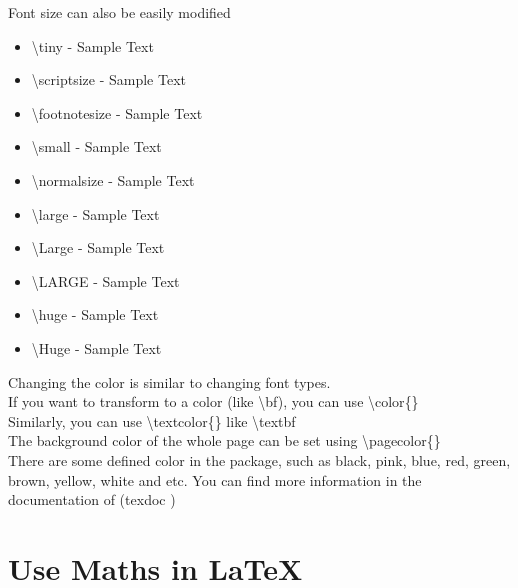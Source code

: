 \documentclass{beamer}
\begin{document}
\begin{frame}
	Font size can also be easily modified
	\begin{itemize}
		\item \alert{\textbackslash tiny} - \tiny{Sample Text}
		\item \alert{\textbackslash scriptsize} - \scriptsize{Sample Text}
		\item \alert{\textbackslash footnotesize} - \footnotesize{Sample Text}
		\item \alert{\textbackslash small} - \small{Sample Text}
		\item \alert{\textbackslash normalsize} - \normalsize{Sample Text}
		\item \alert{\textbackslash large} - \large{Sample Text}
		\item \alert{\textbackslash Large} - \Large{Sample Text}
		\item \alert{\textbackslash LARGE} - \LARGE{Sample Text}
		\item \alert{\textbackslash huge} - \huge{Sample Text}
		\item \alert{\textbackslash Huge} - \Huge{Sample Text}
	\end{itemize}
\end{frame}

\begin{frame}
	Changing the color is similar to changing font types.\\[0.5em]
	If you want to transform to a color (like \alert{\textbackslash bf}), you can use \alert{\textbackslash color}\{\}\\
	Similarly, you can use \alert{\textbackslash textcolor}\{\} like \alert{\textbackslash textbf}\\
	The background color of the whole page can be set using \alert{\textbackslash pagecolor}\{\}\\[0.5em]
	There are some defined color  in the  package, such as black, pink, blue, red, green, brown, yellow, white and etc. You can find more information in the documentation of  (\alert{texdoc} )
\end{frame}


\section{Use Maths in \LaTeX}
\begin{frame}
\end{frame}
\end{document}
